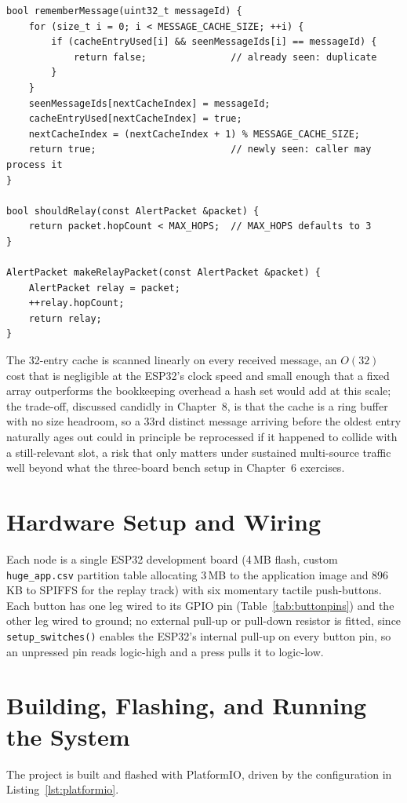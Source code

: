 \documentclass[12pt,a4paper]{report}
\begin{document}
\begin{lstlisting}[caption={Duplicate suppression and hop-capped relaying (\texttt{src/multihop\_relay.cpp}, trimmed)}, label={lst:relay}]
bool rememberMessage(uint32_t messageId) {
    for (size_t i = 0; i < MESSAGE_CACHE_SIZE; ++i) {
        if (cacheEntryUsed[i] && seenMessageIds[i] == messageId) {
            return false;               // already seen: duplicate
        }
    }
    seenMessageIds[nextCacheIndex] = messageId;
    cacheEntryUsed[nextCacheIndex] = true;
    nextCacheIndex = (nextCacheIndex + 1) % MESSAGE_CACHE_SIZE;
    return true;                        // newly seen: caller may process it
}

bool shouldRelay(const AlertPacket &packet) {
    return packet.hopCount < MAX_HOPS;  // MAX_HOPS defaults to 3
}

AlertPacket makeRelayPacket(const AlertPacket &packet) {
    AlertPacket relay = packet;
    ++relay.hopCount;
    return relay;
}
\end{lstlisting}

The 32-entry cache is scanned linearly on every received message, an $O(32)$ cost that is negligible at the ESP32's clock speed and small enough that a fixed array outperforms the bookkeeping overhead a hash set would add at this scale; the trade-off, discussed candidly in Chapter~8, is that the cache is a ring buffer with no size headroom, so a 33rd distinct message arriving before the oldest entry naturally ages out could in principle be reprocessed if it happened to collide with a still-relevant slot, a risk that only matters under sustained multi-source traffic well beyond what the three-board bench setup in Chapter~6 exercises.

\section{Hardware Setup and Wiring}
Each node is a single ESP32 development board (4\,MB flash, custom \texttt{huge\_app.csv} partition table allocating 3\,MB to the application image and 896\,KB to SPIFFS for the replay track) with six momentary tactile push-buttons. Each button has one leg wired to its GPIO pin (Table~\ref{tab:buttonpins}) and the other leg wired to ground; no external pull-up or pull-down resistor is fitted, since \texttt{setup\_switches()} enables the ESP32's internal pull-up on every button pin, so an unpressed pin reads logic-high and a press pulls it to logic-low.

\section{Building, Flashing, and Running the System}
The project is built and flashed with PlatformIO, driven by the configuration in Listing~\ref{lst:platformio}.
\end{document}
